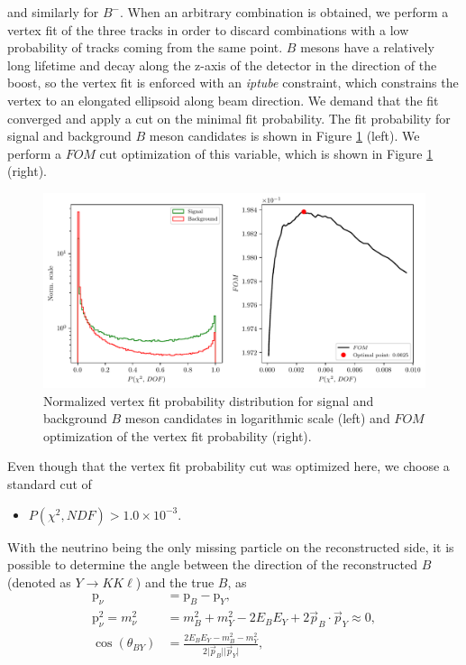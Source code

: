 \documentclass[  headings=standardclasses,
  headings=big,oneside,a4paper,openany,12pt]{scrbook}
\newcommand {\E}[1]{\times 10^{#1}}
\begin{document}
and similarly for $B^-$. When an arbitrary combination is obtained, we perform a vertex fit of the three tracks in order to discard combinations with a low probability of tracks coming from the same point. $B$ mesons have a relatively long lifetime and decay along the z-axis of the detector in the direction of the boost, so the vertex fit is enforced with an \textit{iptube} constraint, which constrains the vertex to an elongated ellipsoid along beam direction. We demand that the fit converged and apply a cut on the minimal fit probability. The fit probability for signal and background $B$ meson candidates is shown in Figure \ref{fig:vtx} (left). We perform a $FOM$ cut optimization of this variable, which is shown in Figure \ref{fig:vtx} (right).

\begin{figure}[H]
\centering
\captionsetup{width=0.8\linewidth}
\includegraphics[width=\linewidth]{fig/VTX}
\caption{Normalized vertex fit probability distribution for signal and background $B$ meson candidates in logarithmic scale (left) and $FOM$ optimization of the vertex fit probability (right).}
\label{fig:vtx}
\end{figure}

Even though that the vertex fit probability cut was optimized here, we choose a standard cut of
\begin{itemize}
\item $P(\chi^2,NDF) > 1.0\E{-3}$.
\end{itemize}

With the neutrino being the only missing particle on the reconstructed side, it is possible to determine the angle between the direction of the reconstructed $B$ (denoted as $Y \to K K \ell$) and the true $B$, as
\begin{align}
\mathrm{p}_\nu &= \mathrm{p}_B - \mathrm{p}_{Y}, \\
\label{eq:massnu}
\mathrm{p}_\nu^2 = m_\nu^2 &= m_B^2 + m_Y^2 - 2E_BE_Y + 2\vec{p}_B \cdot \vec{p}_Y \approx 0, \\ 
\label{eq:cosby}
\cos \left(\theta_{BY}\right) &= \frac{2E_BE_Y - m_B^2 - m_Y^2}{2\vert \vec{p}_B \vert \vert \vec{p}_Y\vert},
\end{align} 
\end{document}
